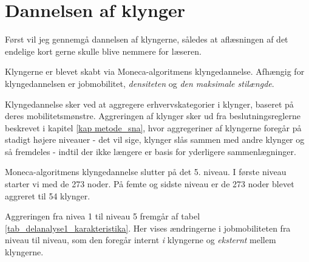 \section{Dannelsen af klynger \label{delanalyse1_segmenteringsprocessen}}

Først vil jeg gennemgå dannelsen af klyngerne, således at aflæsningen af det endelige kort gerne skulle blive nemmere for læseren. 

Klyngerne er blevet skabt via Moneca-algoritmens klyngedannelse. Afhængig for klyngedannelsen er jobmobilitet, \emph{densiteten} og \emph{den maksimale stilængde}.

Klyngedannelse sker ved at aggregere erhvervskategorier i klynger, baseret på deres mobilitetsmønstre. Aggreringen af klynger sker ud fra beslutningsreglerne beskrevet i kapitel \ref{kap metode_sna}, hvor aggregeriner af klyngerne foregår på stadigt højere niveauer - det vil sige, klynger slås sammen med andre klynger og så fremdeles - indtil der ikke længere er basis for yderligere sammenlægninger.

Moneca-algoritmens klyngedannelse slutter på det 5. niveau. I første niveau starter vi med de 273 noder. På femte og sidste niveau er de 273 noder blevet aggreret til 54 klynger.

Aggreringen fra nivea 1 til niveau 5 fremgår af tabel \ref{tab_delanalyse1_karakteristika}. Her vises ændringerne i jobmobiliteten fra niveau til niveau, som den foregår internt \emph{i} klyngerne og \emph{eksternt} mellem klyngerne.

% 
\begin{table}[H] \centering
\caption{Karakteristika for klyngedannelsen}
\label{tab_delanalyse1_karakteristika}
\end{table}
%

